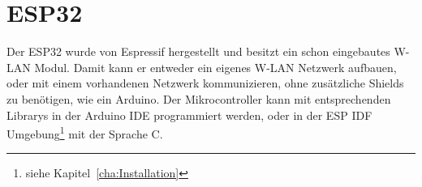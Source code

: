 \section{ESP32}
Der ESP32 wurde von Espressif hergestellt und besitzt ein schon eingebautes W-LAN Modul. Damit kann er entweder ein eigenes W-LAN Netzwerk aufbauen, oder mit einem vorhandenen Netzwerk kommunizieren, ohne zusätzliche Shields zu benötigen, wie ein Arduino. Der Mikrocontroller kann mit entsprechenden Librarys in der Arduino IDE programmiert werden, oder in der ESP IDF Umgebung\footnote{siehe Kapitel~\ref{cha:Installation}} mit der Sprache C.
